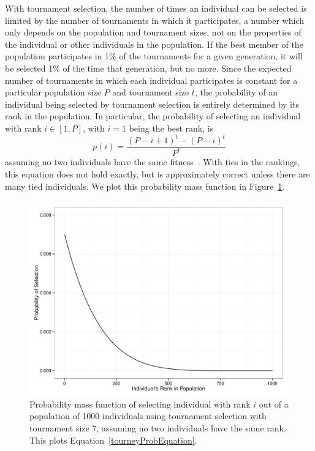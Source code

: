\documentclass{sig-alternate}
\begin{document}
With tournament selection, the number of times an individual can be selected is limited by the number of tournaments in which it participates, a number which only depends on the population and tournament sizes, not on the properties of the individual or other individuals in the population. If the best member of the population participates in 1\% of the tournaments for a given generation, it will be selected 1\% of the time that generation, but no more.
Since the expected number of tournaments in which each individual participates is constant for a particular population size $P$ and tournament size $t$, the probability of an individual being selected by tournament selection is entirely determined by its rank in the population. In particular, the probability of selecting an individual with rank $i \in [1,P]$, with $i = 1$ being the best rank, is
\begin{equation}\label{tourneyProbEquation}
p(i) = \frac{(P-i+1)^t - (P-i)^t}{P^t}
\end{equation}
assuming no two individuals have the same fitness~\cite{350042, Blickle:1995:MAT:645514.658088}. With ties in the rankings, this equation does not hold exactly, but is approximately correct unless there are many tied individuals. We plot this probability mass function in Figure~\ref{fig:prob-selection-tourney-7}.

\begin{figure}[t] %
\centering
\includegraphics[width=\linewidth]{probSelectionTourney7.pdf}
\caption{Probability mass function of selecting individual with rank $i$ out of a population of 1000 individuals using tournament selection with tournament size 7, assuming no two individuals have the same rank. This plots Equation~\ref{tourneyProbEquation}.}
\label{fig:prob-selection-tourney-7}
\end{figure}
\end{document}
